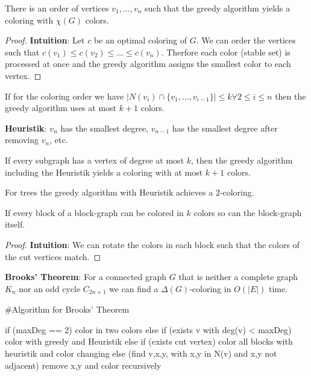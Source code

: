 \begin{lemma}
	There is an order of vertices $v_1, \dots, v_n$ such that the greedy algorithm yields a coloring with $\chi(G)$ colors.
\end{lemma}

\begin{proof}
	\textbf{Intuition}: Let $c$ be an optimal coloring of $G$. We can order the vertices such that $c(v_1) \le c(v_2) \le \dots \le c(v_n)$. Therfore each color (stable set) is processed at once and the greedy algorithm assigns the smallest color to each vertex.
\end{proof}

\begin{lemma}
	If for the coloring order we have $|N(v_i) \cap \{v_1, \dots, v_{i-1}\} | \leq k \forall 2 \leq i \leq n$ then the greedy algorithm uses at most $k+1$ colors.
\end{lemma}

\begin{remark}
	\textbf{Heuristik}: $v_n$ has the smallest degree, $v_{n-1}$ has the smallest degree after removing $v_n$, etc.
\end{remark}

\begin{remark}
	If every subgraph has a vertex of degree at most $k$, then the greedy algorithm including the Heuristik yields a coloring with at most $k+1$ colors.
\end{remark}

\begin{example}
	For trees the greedy algorithm with Heuristik achieves a $2$-coloring.
\end{example}

\begin{lemma}
	If every block of a block-graph can be colored in $k$ colors so can the block-graph itself.
\end{lemma}

\begin{proof}
	\textbf{Intuition}: We can rotate the colors in each block such that the colors of the cut vertices match.
\end{proof}

\begin{theorem}
	\textbf{Brooks' Theorem}: For a connected graph $G$ that is neither a complete graph $K_n$ nor an odd cycle $C_{2n+1}$ we can find a $\Delta(G)$-coloring in $O(|E|)$ time.
\end{theorem}

\begin{algorithm}
	#Algorithm for Brooks' Theorem

	if (maxDeg == 2) color in two colors
	else if (exists v with deg(v) < maxDeg)
	color with greedy and Heuristik
	else if (exists cut vertex)
	color all blocks with heuristik and color changing
	else (find v,x,y, with x,y in N(v) and x,y not adjacent)
	remove x,y and color recursively
\end{algorithm}

